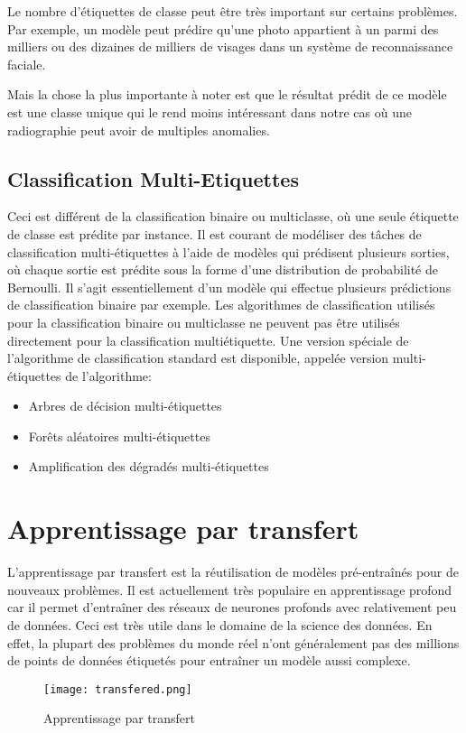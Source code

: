         Le nombre d'étiquettes de classe peut être très important sur certains problèmes. Par exemple, un modèle peut prédire qu'une photo appartient à un parmi des milliers ou des dizaines de milliers de visages dans un système de reconnaissance faciale.

        Mais la chose la plus importante à noter est que le résultat prédit de ce modèle est une classe unique qui le rend moins intéressant dans notre cas où une radiographie peut avoir de multiples anomalies.
    \subsection{Classification Multi-Etiquettes}
        Ceci est différent de la classification binaire ou multiclasse, où une seule étiquette de classe est prédite par instance. 
        Il est courant de modéliser des tâches de classification multi-étiquettes à l'aide de modèles qui prédisent plusieurs sorties, où chaque sortie est prédite sous la forme d'une distribution de probabilité de Bernoulli. Il s'agit essentiellement d'un modèle qui effectue plusieurs prédictions de classification binaire par exemple. 
        Les algorithmes de classification utilisés pour la classification binaire ou multiclasse ne peuvent pas être utilisés directement pour la classification multiétiquette. Une version spéciale de l'algorithme de classification standard est disponible, appelée version multi-étiquettes de l'algorithme:
        \begin{itemize}[label=$\bullet$]
            \item Arbres de décision multi-étiquettes
            \item Forêts aléatoires multi-étiquettes
            \item Amplification des dégradés multi-étiquettes
        \end{itemize}


\section{Apprentissage par transfert}
    L'apprentissage par transfert est la réutilisation de modèles pré-entraînés pour de nouveaux problèmes. Il est actuellement très populaire  en apprentissage profond car il permet d'entraîner des réseaux de neurones profonds avec relativement peu de données. Ceci est très utile dans le domaine de la science des données. En effet, la plupart des problèmes du monde réel n'ont généralement pas des millions de points de données étiquetés pour entraîner un modèle aussi complexe.
    \begin{figure}[H] 
        \centering
        \texttt{[image: transfered.png]}
        \caption{Apprentissage par transfert}
        \label{fig:transfer_learning}
    \end{figure}

